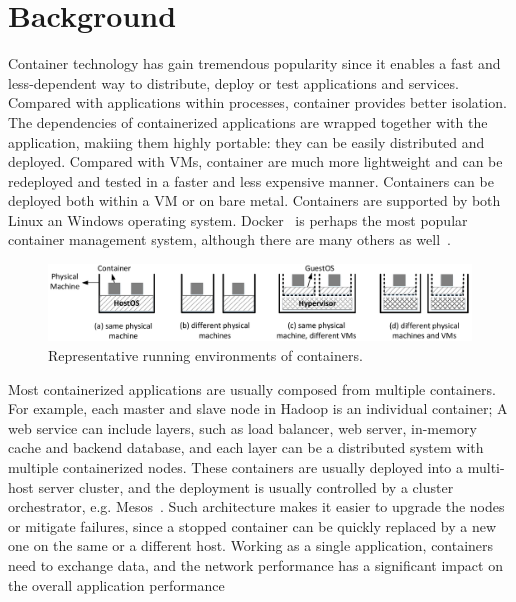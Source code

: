 \section{Background}
\label{sec:motivation}

Container technology has gain tremendous popularity since it enables a fast and
less-dependent way to distribute, deploy or test applications and services. 
Compared with applications within processes, container provides better
isolation. The dependencies of containerized applications are wrapped together
with the application, makiing them highly portable: they can be easily
distributed and deployed.  Compared with VMs, container are much more
lightweight and can be redeployed and tested in a faster and less expensive
manner. Containers can be deployed both within a VM or on bare metal. Containers
are supported by both Linux an Windows operating system.  Docker~\cite{xxx} is
perhaps the most popular container management system, although there are many
others as well~\cite{xxx}.

\begin{figure}  
	\centering   
	\includegraphics[width=6.7in]{figures/deployment-cases.pdf}   
	\caption{\label{fig:deploy-cases} Representative running environments of containers.}   
\end{figure}

Most containerized applications are usually composed from multiple containers.
For example, each master and slave node in Hadoop is an individual container; A
web service can include layers, such as load balancer, web server, in-memory
cache and backend database, and each layer can be a distributed system with
multiple containerized nodes. These containers are usually deployed into a
multi-host server cluster, and the deployment is usually controlled by a cluster
orchestrator, e.g. Mesos~\cite{xxx}.  Such architecture makes it easier to
upgrade the nodes or mitigate failures, since a stopped container can be quickly
replaced by a new one on the same or a different host.  Working as a single
application, containers need to exchange data, and the network performance has a
significant impact on the overall application performance~\cite{coflow-etc.}

